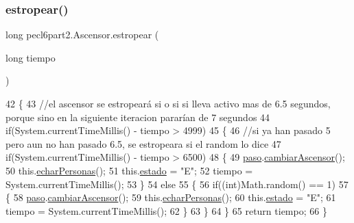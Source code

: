 \subsubsection{\texorpdfstring{estropear()}{estropear()}}
{\footnotesize\ttfamily long pecl6part2.\+Ascensor.\+estropear (\begin{DoxyParamCaption}\item[{long}]{tiempo }\end{DoxyParamCaption})\hspace{0.3cm}{\ttfamily [inline]}}


\begin{DoxyCode}
42     \{
43         \textcolor{comment}{//el ascensor se estropeará si o si si lleva activo mas de 6.5 segundos, porque sino en la
       siguiente iteracion pararían de 7 segundos}
44         \textcolor{keywordflow}{if}(System.currentTimeMillis() - tiempo > 4999)
45         \{
46             \textcolor{comment}{//si ya han pasado 5 pero aun no han pasado 6.5,  se estropeara si el random lo dice}
47             \textcolor{keywordflow}{if}(System.currentTimeMillis() - tiempo > 6500)
48             \{
49                 \mbox{\hyperlink{classpecl6part2_1_1_ascensor_adc56f3cc0cc6adaf409f5aeb4283808f}{paso}}.\mbox{\hyperlink{classpecl6part2_1_1_monitor_aba7c54d3f7bb8f4e19bcec5d7f8dcb76}{cambiarAscensor}}();
50                 this.\mbox{\hyperlink{classpecl6part2_1_1_ascensor_afe4d81d992e11113248e2637e523c28d}{echarPersonas}}();
51                 this.\mbox{\hyperlink{classpecl6part2_1_1_ascensor_a6a578a2c1bc59586257fe412a44354ac}{estado}} = \textcolor{stringliteral}{"E"};
52                 tiempo = System.currentTimeMillis();
53             \}
54             \textcolor{keywordflow}{else}
55             \{
56                 \textcolor{keywordflow}{if}((\textcolor{keywordtype}{int})Math.random() == 1)
57                 \{
58                     \mbox{\hyperlink{classpecl6part2_1_1_ascensor_adc56f3cc0cc6adaf409f5aeb4283808f}{paso}}.\mbox{\hyperlink{classpecl6part2_1_1_monitor_aba7c54d3f7bb8f4e19bcec5d7f8dcb76}{cambiarAscensor}}();
59                     this.\mbox{\hyperlink{classpecl6part2_1_1_ascensor_afe4d81d992e11113248e2637e523c28d}{echarPersonas}}();
60                     this.\mbox{\hyperlink{classpecl6part2_1_1_ascensor_a6a578a2c1bc59586257fe412a44354ac}{estado}} = \textcolor{stringliteral}{"E"};
61                     tiempo = System.currentTimeMillis();
62                 \}
63             \}
64         \}
65         \textcolor{keywordflow}{return} tiempo;
66     \}
\end{DoxyCode}
\mbox{\label{classpecl6part2_1_1_ascensor_af45fe15f097cdb4d74fb0bce843ccac6}} 

